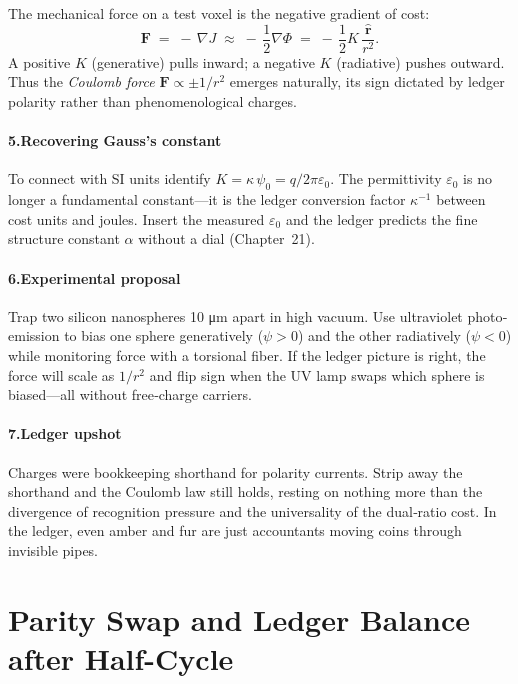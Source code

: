 \documentclass[11pt,oneside]{book}
\begin{document}
The mechanical force on a test voxel is the negative gradient of cost:
\[
  \mathbf F
  \;=\;
  -\,\nabla J
  \;\approx\;
  -\,\frac12\nabla\Phi
  \;=\;
  -\,\frac12 K\,\frac{\widehat{\mathbf r}}{r^{2}}.
\]
A positive \(K\) (generative) pulls inward; a negative \(K\) (radiative)
pushes outward.  
Thus the \emph{Coulomb force}
\(
  \mathbf F\propto\pm1/r^{2}
\)
emerges naturally, its sign dictated by ledger polarity rather than
phenomenological charges.  

\paragraph*{5.\;Recovering Gauss’s constant}

To connect with SI units identify
\(K=\kappa\,\psi_{0}=q/2\pi\varepsilon_{0}\).
The permittivity \(\varepsilon_{0}\) is no longer a fundamental
constant—it is the ledger conversion factor
\(\kappa^{-1}\) between cost units and joules.  
Insert the measured \(\varepsilon_{0}\) and the ledger predicts the fine
structure constant \(\alpha\) without a dial (Chapter~21).

\paragraph*{6.\;Experimental proposal}

Trap two silicon nanospheres 10 μm apart in high vacuum.  
Use ultraviolet photo‐emission to bias one sphere generatively
(\(\psi>0\)) and the other radiatively (\(\psi<0\)) while monitoring
force with a torsional fiber.  
If the ledger picture is right, the force will scale as \(1/r^{2}\) and
flip sign when the UV lamp swaps which sphere is biased—all without
free‐charge carriers.

\paragraph*{7.\;Ledger upshot}

Charges were bookkeeping shorthand for polarity currents.  
Strip away the shorthand and the Coulomb law still holds, resting on
nothing more than the divergence of recognition pressure and the
universality of the dual‐ratio cost.  In the ledger, even amber and fur
are just accountants moving coins through invisible pipes.

\section{Parity Swap and Ledger Balance after Half-Cycle}
\label{sec:parity-swap}
\end{document}
